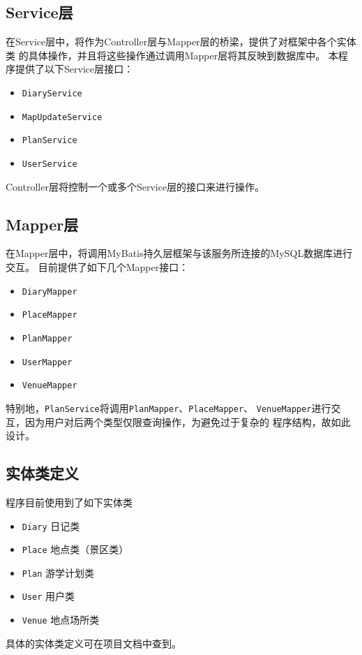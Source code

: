 \documentclass{report}
\begin{document}
\subsection{Service层}
在Service层中，将作为Controller层与Mapper层的桥梁，提供了对框架中各个实体类
的具体操作，并且将这些操作通过调用Mapper层将其反映到数据库中。
本程序提供了以下Service层接口：
\begin{itemize}
    \item \verb|DiaryService|
    \item \verb|MapUpdateService|
    \item \verb|PlanService|
    \item \verb|UserService|
\end{itemize}
Controller层将控制一个或多个Service层的接口来进行操作。

\subsection{Mapper层}
在Mapper层中，将调用MyBatis持久层框架与该服务所连接的MySQL数据库进行交互。
目前提供了如下几个Mapper接口：
\begin{itemize}
    \item \verb|DiaryMapper|
    \item \verb|PlaceMapper|
    \item \verb|PlanMapper|
    \item \verb|UserMapper|
    \item \verb|VenueMapper|
\end{itemize}
\par
特别地，\verb|PlanService|将调用\verb|PlanMapper|、\verb|PlaceMapper|、
\verb|VenueMapper|进行交互，因为用户对后两个类型仅限查询操作，为避免过于复杂的
程序结构，故如此设计。

\subsection{实体类定义}
程序目前使用到了如下实体类
\begin{itemize}
    \item \verb|Diary| 日记类
    \item \verb|Place| 地点类（景区类）
    \item \verb|Plan| 游学计划类
    \item \verb|User| 用户类
    \item \verb|Venue| 地点场所类
\end{itemize}
具体的实体类定义可在项目文档中查到。
\end{document}

